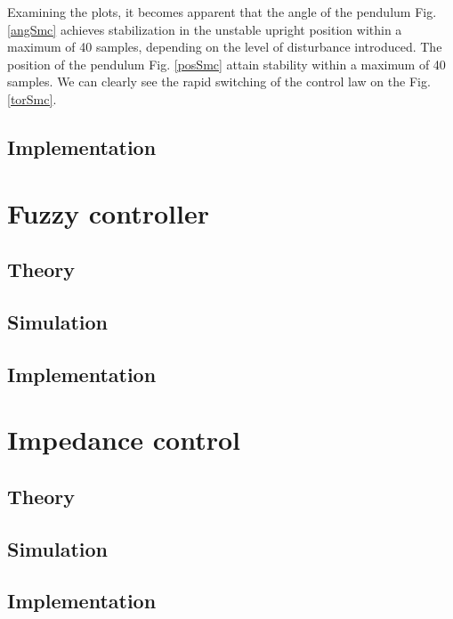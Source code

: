 Examining the plots, it becomes apparent that the angle of the pendulum Fig. \ref{angSmc} achieves stabilization in the unstable upright position within a maximum of 40 samples, depending on the level of disturbance introduced. The position of the pendulum Fig. \ref{posSmc} attain stability within a maximum of 40 samples. We can clearly see the rapid switching of the control law on the Fig. \ref{torSmc}. 

\subsection{Implementation}

\newpage
\section{Fuzzy controller}
\subsection{Theory}
\subsection{Simulation}
\subsection{Implementation}

\newpage
\section{Impedance control}
\subsection{Theory}
\subsection{Simulation}
\subsection{Implementation}